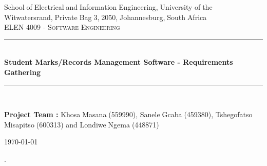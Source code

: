 \documentclass[10pt,onecolumn]{lab}
\begin{document}
\begin{titlepage}

\newcommand{\HRule}{\rule{\linewidth}{0.5mm}} %

\center %
{\small School$\;$of$\;$Electrical$\;$and$\;$Information$\;$Engineering,$\;$University of$\;$the$\;$Witwatersrand,$\;$Private$\;$Bag$\;$3,$\;$2050,$\;$Johannesburg,$\;$South$\;$Africa}\\[1.5cm] %

\textsc{ELEN 4009 - Software Engineering}\\[0.5cm] %

\HRule \\[0.4cm]
{ \large \bfseries Student Marks/Records Management Software - Requirements Gathering}\\[0.4cm] %
\HRule \\[1.5cm]

 \large

\textbf{Project Team :}
Khosa$\;$Masana$\;$(559990),
Sanele$\;$Gcaba$\;$(459380),
Tshegofatso$\;$Misapitso$\;$(600313) and
Londiwe$\;$Ngema$\;$(448871)


{\large \today}\\[3cm] %


\vfill %

\end{titlepage}

\pagestyle{plain}.
\tableofcontents 
\newpage
\end{document}
